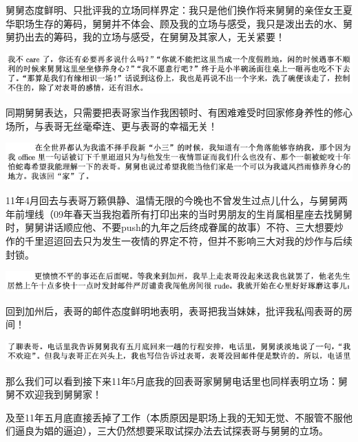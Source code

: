 \documentclass[9pt, b5paper]{article}
\begin{document}
舅舅态度鲜明、只批评我的立场同样界定：我只是他们换作将来舅舅的亲侄女王夏华职场生存的筹码，舅舅并不体会、顾及我的立场与感受，我只是泼出去的水、舅舅扔出去的筹码，我的立场与感受，在舅舅及其家人，无关紧要！

\begin{center}
\includegraphics[width=.9\linewidth]{./pic/backups_plans_20210412_171513.png}
\end{center}

同期舅舅表达，只需要把表哥家当作我困顿时、有困难难受时回家修身养性的修心场所，与表哥无丝毫牵连、更与表哥的幸福无关！

\begin{center}
\includegraphics[width=.9\linewidth]{./pic/backups_plans_20210412_171721.png}
\end{center}

11年4月回去与表哥万籁俱静、温情无限的今晚也不曾发生过点儿什么，与舅舅两年前埋线（09年春天当我抱着所有打印出来的当时男朋友的生肖属相星座去找舅舅时，舅舅讲话顺应他、不要push的九年之后终成眷属的故事）不符、三大想要炒作的千里迢迢回去只为发生一夜情的界定不符，但并不影响三大对我的炒作与后续封锁。

\begin{center}
\includegraphics[width=.9\linewidth]{./pic/backups_plans_20210412_171817.png}
\end{center}

回到加州后，表哥的邮件态度鲜明地表明，表哥把我当妹妹，批评我私闯表哥的房间！

\begin{center}
\includegraphics[width=.9\linewidth]{./pic/backups_plans_20210412_171851.png}
\end{center}

那么我们可以看到接下来11年5月底我的回表哥家舅舅电话里也同样表明立场：舅舅不欢迎我到舅舅家！

及至11年五月底直接丢掉了工作（本质原因是职场上我的无知无觉、不服管不服他们逼良为娼的逼迫），三大仍然想要采取试探办法去试探表哥与舅舅的立场。
\end{document}
